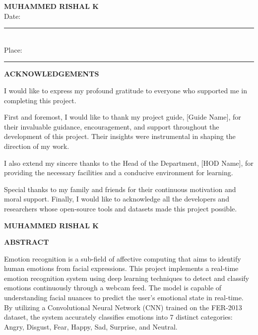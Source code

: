\documentclass[12pt,a4paper]{report}
\begin{document}
\vspace{3cm}
\begin{flushright}
    \textbf{MUHAMMED RISHAL K} \\
    Date: \rule{3cm}{0.4pt} \\
    Place: \rule{3cm}{0.4pt}
\end{flushright}


\newpage
{}
\begin{center}
    \Huge \textbf{ACKNOWLEDGEMENTS}
\end{center}
\vspace{1cm}
I would like to express my profound gratitude to everyone who supported me in completing this project. 

First and foremost, I would like to thank my project guide, [Guide Name], for their invaluable guidance, encouragement, and support throughout the development of this project. Their insights were instrumental in shaping the direction of my work.

I also extend my sincere thanks to the Head of the Department, [HOD Name], for providing the necessary facilities and a conducive environment for learning.

Special thanks to my family and friends for their continuous motivation and moral support. Finally, I would like to acknowledge all the developers and researchers whose open-source tools and datasets made this project possible.

\vspace{2cm}
\begin{flushright}
    \textbf{MUHAMMED RISHAL K}
\end{flushright}

\newpage
{}
\begin{center}
    \Huge \textbf{ABSTRACT}
\end{center}
\vspace{1.5cm}
Emotion recognition is a sub-field of affective computing that aims to identify human emotions from facial expressions. This project implements a real-time emotion recognition system using deep learning techniques to detect and classify emotions continuously through a webcam feed. The model is capable of understanding facial nuances to predict the user's emotional state in real-time. By utilizing a Convolutional Neural Network (CNN) trained on the FER-2013 dataset, the system accurately classifies emotions into 7 distinct categories: Angry, Disgust, Fear, Happy, Sad, Surprise, and Neutral.
\end{document}
